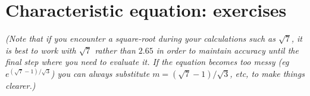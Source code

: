 



%
%
%
%
%
%
%
%
%




\newpage
\section{Characteristic equation: exercises}

\emph{(Note that if you encounter a square-root during your calculations such as $\sqrt{7}$, it is best to work with $\sqrt{7}$ rather than $2.65$ in order to maintain accuracy until the final step where you need to evaluate it. If the equation becomes too messy (eg $e^{(\sqrt{7}-1)/\sqrt{3}}$) you can always substitute $m=(\sqrt{7}-1)/\sqrt{3}$, etc, to make things clearer.)}

